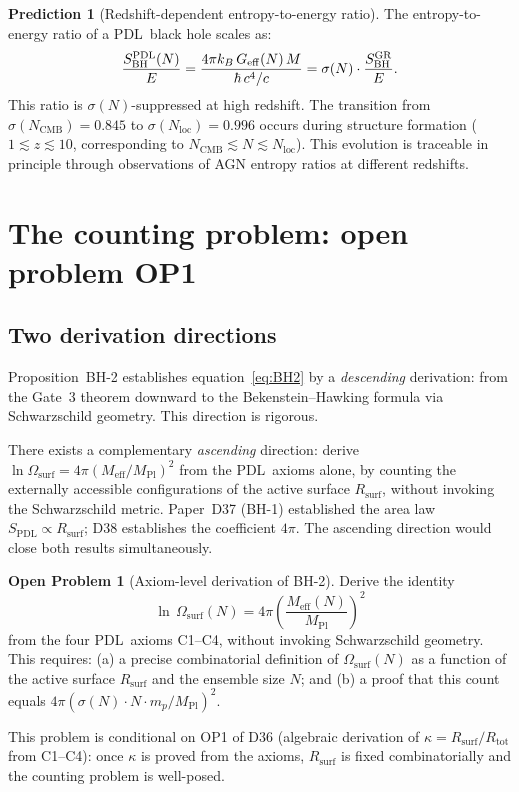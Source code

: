 \documentclass[11pt,a4paper]{article}
\theoremstyle{definition}
\newtheorem{openprob}{Open Problem}
\newtheorem{prediction}[theorem]{Prediction}
\newcommand{\PDL}{\textnormal{PDL}}
\newcommand{\Rtot}{R_{\mathrm{tot}}}
\newcommand{\Rsurf}{R_{\mathrm{surf}}}
\newcommand{\kap}{\kappa}
\newcommand{\sig}{\sigma}
\newcommand{\Geff}{G_{\mathrm{eff}}}
\newcommand{\hb}{\hbar}
\newcommand{\SBH}{S_{\mathrm{BH}}}
\newcommand{\SPDL}{S_{\mathrm{PDL}}}
\newcommand{\Meff}{M_{\mathrm{eff}}}
\newcommand{\MPl}{M_{\mathrm{Pl}}}
\newcommand{\Omsurf}{\Omega_{\mathrm{surf}}}
\begin{document}
\begin{prediction}[Redshift-dependent entropy-to-energy ratio]
\label{pred:SoverE}
The entropy-to-energy ratio of a \PDL\ black hole scales as:
\begin{equation}
\frac{\SBH^\PDL(N)}{E} = \frac{4\pi k_B\,\Geff(N)\,M}{\hb\,c^4/c}
= \sig(N)\cdot\frac{\SBH^\mathrm{GR}}{E}.
\label{eq:SoverE}
\end{equation}
This ratio is $\sig(N)$-suppressed at high redshift. The transition from
$\sig(N_\mathrm{CMB}) = 0.845$ to $\sig(N_\mathrm{loc}) = 0.996$ occurs
during structure formation ($1 \lesssim z \lesssim 10$, corresponding to
$N_\mathrm{CMB} \lesssim N \lesssim N_\mathrm{loc}$). This evolution is
traceable in principle through observations of AGN entropy ratios at
different redshifts.
\end{prediction}

\section{The counting problem: open problem OP1}
\label{sec:counting}

\subsection{Two derivation directions}

Proposition~BH-2 establishes equation~\eqref{eq:BH2} by a \emph{descending}
derivation: from the Gate~3 theorem downward to the Bekenstein--Hawking formula
via Schwarzschild geometry. This direction is rigorous.

There exists a complementary \emph{ascending} direction: derive
$\ln\Omsurf = 4\pi(\Meff/\MPl)^2$ from the \PDL\ axioms alone, by counting
the externally accessible configurations of the active surface $\Rsurf$,
without invoking the Schwarzschild metric. Paper~D37 (BH-1) established the
area law $\SPDL \propto \Rsurf$; D38 establishes the coefficient $4\pi$.
The ascending direction would close both results simultaneously.

\begin{openprob}[Axiom-level derivation of BH-2]
\label{op:counting}
Derive the identity
\begin{equation}
\ln\,\Omega_{\mathrm{surf}}(N) = 4\pi\left(\frac{\Meff(N)}{\MPl}\right)^2
\label{eq:op1}
\end{equation}
from the four \PDL\ axioms C1--C4, without invoking Schwarzschild geometry.
This requires: (a) a precise combinatorial definition of $\Omsurf(N)$ as a
function of the active surface $\Rsurf$ and the ensemble size $N$; and (b)
a proof that this count equals $4\pi(\sig(N)\cdot N\cdot m_p/\MPl)^2$.

This problem is conditional on OP1 of D36 (algebraic derivation of
$\kap = \Rsurf/\Rtot$ from C1--C4): once $\kap$ is proved from the axioms,
$\Rsurf$ is fixed combinatorially and the counting problem is well-posed.
\end{openprob}
\end{document}
